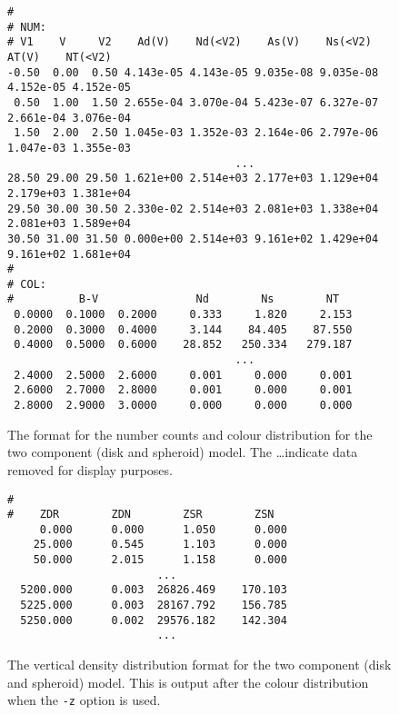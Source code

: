 \documentclass[11pt,twoside]{article}
\begin{document}
\begin{figure}[p]
\begin{center}
\begin{verbatim}
#
# NUM:
# V1    V     V2    Ad(V)    Nd(<V2)    As(V)    Ns(<V2)    AT(V)    NT(<V2)
-0.50  0.00  0.50 4.143e-05 4.143e-05 9.035e-08 9.035e-08 4.152e-05 4.152e-05
 0.50  1.00  1.50 2.655e-04 3.070e-04 5.423e-07 6.327e-07 2.661e-04 3.076e-04
 1.50  2.00  2.50 1.045e-03 1.352e-03 2.164e-06 2.797e-06 1.047e-03 1.355e-03
                                   ...
28.50 29.00 29.50 1.621e+00 2.514e+03 2.177e+03 1.129e+04 2.179e+03 1.381e+04
29.50 30.00 30.50 2.330e-02 2.514e+03 2.081e+03 1.338e+04 2.081e+03 1.589e+04
30.50 31.00 31.50 0.000e+00 2.514e+03 9.161e+02 1.429e+04 9.161e+02 1.681e+04
#
# COL:
#          B-V               Nd        Ns        NT
 0.0000  0.1000  0.2000     0.333     1.820     2.153
 0.2000  0.3000  0.4000     3.144    84.405    87.550
 0.4000  0.5000  0.6000    28.852   250.334   279.187
                                   ...
 2.4000  2.5000  2.6000     0.001     0.000     0.001
 2.6000  2.7000  2.8000     0.001     0.000     0.001
 2.8000  2.9000  3.0000     0.000     0.000     0.000
\end{verbatim}
\end{center}
\caption{The format for the number counts and colour distribution for the 
two component (disk and spheroid) model. The \ldots indicate data removed for
display purposes.}
\end{figure}

\begin{figure}[p]
\begin{center}
\begin{verbatim}
#
#    ZDR        ZDN        ZSR        ZSN
     0.000      0.000      1.050      0.000 
    25.000      0.545      1.103      0.000 
    50.000      2.015      1.158      0.000 
                       ...
  5200.000      0.003  26826.469    170.103 
  5225.000      0.003  28167.792    156.785 
  5250.000      0.002  29576.182    142.304 
                       ...
\end{verbatim}
\end{center}
\caption{The vertical density distribution format for the two component (disk
and spheroid) model. This is output after the colour distribution when the
{\tt -z} option is used.}
\end{figure}
\end{document}
